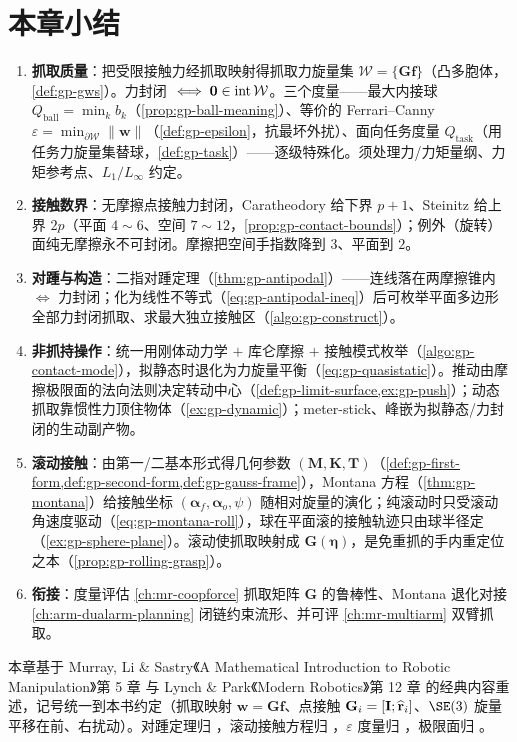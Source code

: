 \section*{本章小结}
\begin{enumerate}
  \item \textbf{抓取质量}：把受限接触力经抓取映射得抓取力旋量集 $\mathcal{W}=\{\mathbf{G}\mathbf{f}\}$（凸多胞体，\cref{def:gp-gws}）。力封闭 $\iff\mathbf{0}\in\operatorname{int}\mathcal{W}$。三个度量——最大内接球 $Q_{\text{ball}}=\min_k b_k$（\cref{prop:gp-ball-meaning}）、等价的 Ferrari--Canny $\varepsilon=\min_{\partial\mathcal{W}}\|\mathbf{w}\|$（\cref{def:gp-epsilon}，抗最坏外扰）、面向任务度量 $Q_{\text{task}}$（用任务力旋量集替球，\cref{def:gp-task}）——逐级特殊化。须处理力/力矩量纲、力矩参考点、$L_1/L_\infty$ 约定。
  \item \textbf{接触数界}：无摩擦点接触力封闭，Caratheodory 给下界 $p+1$、Steinitz 给上界 $2p$（平面 $4\!\sim\!6$、空间 $7\!\sim\!12$，\cref{prop:gp-contact-bounds}）；例外（旋转）面纯无摩擦永不可封闭。摩擦把空间手指数降到 $3$、平面到 $2$。
  \item \textbf{对踵与构造}：二指对踵定理（\cref{thm:gp-antipodal}）——连线落在两摩擦锥内 $\iff$ 力封闭；化为线性不等式（\cref{eq:gp-antipodal-ineq}）后可枚举平面多边形全部力封闭抓取、求最大独立接触区（\cref{algo:gp-construct}）。
  \item \textbf{非抓持操作}：统一用刚体动力学 $+$ 库仑摩擦 $+$ 接触模式枚举（\cref{algo:gp-contact-mode}），拟静态时退化为力旋量平衡（\cref{eq:gp-quasistatic}）。推动由摩擦极限面的法向法则决定转动中心（\cref{def:gp-limit-surface,ex:gp-push}）；动态抓取靠惯性力顶住物体（\cref{ex:gp-dynamic}）；meter-stick、峰嵌为拟静态/力封闭的生动副产物。
  \item \textbf{滚动接触}：由第一/二基本形式得几何参数 $(\mathbf{M},\mathbf{K},\mathbf{T})$（\cref{def:gp-first-form,def:gp-second-form,def:gp-gauss-frame}），Montana 方程（\cref{thm:gp-montana}）给接触坐标 $(\boldsymbol{\alpha}_f,\boldsymbol{\alpha}_o,\psi)$ 随相对旋量的演化；纯滚动时只受滚动角速度驱动（\cref{eq:gp-montana-roll}），球在平面滚的接触轨迹只由球半径定（\cref{ex:gp-sphere-plane}）。滚动使抓取映射成 $\mathbf{G}(\boldsymbol{\eta})$，是免重抓的手内重定位之本（\cref{prop:gp-rolling-grasp}）。
  \item \textbf{衔接}：度量评估 \cref{ch:mr-coopforce} 抓取矩阵 $\mathbf{G}$ 的鲁棒性、Montana 退化对接 \cref{ch:arm-dualarm-planning} 闭链约束流形、并可评 \cref{ch:mr-multiarm} 双臂抓取。
\end{enumerate}

\begin{finenote}
本章基于 Murray, Li \& Sastry《A Mathematical Introduction to Robotic Manipulation》第 5 章\cite{murray1994mathematical} 与 Lynch \& Park《Modern Robotics》第 12 章\cite{lynch2017modern} 的经典内容重述，记号统一到本书约定（抓取映射 $\mathbf{w}=\mathbf{G}\mathbf{f}$、点接触 $\mathbf{G}_i=[\mathbf{I};\widehat{\mathbf{r}}_i]$、$\SE(3)$ 旋量平移在前、右扰动）。对踵定理归 \citeauthor{nguyen1988}\cite{nguyen1988}，滚动接触方程归 \citeauthor{montana1988}\cite{montana1988}，$\varepsilon$ 度量归 \citeauthor{ferrari1992}\cite{ferrari1992}，极限面归 \citeauthor{goyal1991planar}\cite{goyal1991planar}。
\end{finenote}
